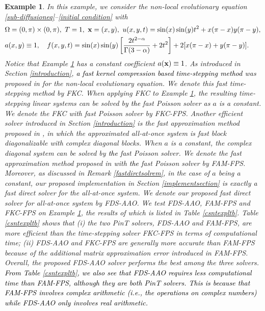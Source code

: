 \documentclass[11pt]{article}%
\numberwithin{equation}{section}
\newtheorem{example}{Example}
\begin{document}
\begin{example}\label{constexmpl}
	{\rm 	
		In this example, we consider the non-local evolutionary equation \eqref{sub-diffusioneq}--\eqref{initial condition} with
		\begin{align*}
		&\Omega=(0,\pi)\times(0,\pi),~ T=1,~{\bf x}=(x,y),~ u(x,y,t)=\sin(x)\sin(y)t^2+x(\pi-x)y(\pi-y),\\
		& a(x,y)\equiv 1,\quad f(x,y,t)=\sin(x)\sin(y)\left[\frac{2t^{2-\alpha}}{\Gamma(3-\alpha)}+2t^2\right]+2[x(\pi-x)+y(\pi-y)].
		\end{align*}
		Notice that Example \ref{constexmpl} has a constant coefficient $a({\bf x})\equiv 1$. As introduced in Section \ref{introduction}, \textcolor{black}{a fast kernel compression based  time-stepping method}  was proposed in \cite{jiang2017fast} for the non-local evolutionary equation. We denote  this fast time-stepping method by FKC. When applying FKC to Example \ref{constexmpl}, the resulting time-stepping linear systems can be solved by \textcolor{black}{the} fast Poisson solver as $a$ is a constant. We denote the FKC with fast Poisson solver by FKC-FPS.
	    Another efficient solver introduced in Section \ref{introduction} is the fast approximation method proposed in \cite{lin2016fast}, in which the approximated all-at-once system is fast block diagonalizable with complex diagonal blocks.  When $a$ is a constant, the complex diagonal system can be solved by \textcolor{black}{the} fast Poisson solver. We denote the fast approximation method proposed in \cite{lin2016fast} with \textcolor{black}{the} fast Poisson solver by FAM-FPS. Moreover, as discussed in Remark \ref{fastdirctsolrem}, in the case of $a$ being a constant, our proposed implementation in Section \ref{implementsection} is exactly a fast direct solver for the all-at-once system. We denote our proposed fast direct solver for all-at-once system by FDS-AAO. We test FDS-AAO, FAM-FPS and FKC-FPS on Example \ref{constexmpl}, the results of which is listed in Table \ref{csntexpltb}. Table \ref{csntexpltb} shows that (i) the two PinT solvers, FDS-AAO and FAM-FPS, are  more efficient than the time-stepping solver FKC-FPS in terms of computational time; (ii) FDS-AAO and FKC-FPS are generally more accurate than FAM-FPS because of the additional matrix approximation error introduced in FAM-FPS. Overall, the proposed FDS-AAO solver performs the best among the three solvers. \textcolor{black}{From Table \ref{csntexpltb}, we also see that FDS-AAO requires less computational time than FAM-FPS, although they are both PinT solvers. This is because that  FAM-FPS involves complex arithmetic (i.e., the operations on complex numbers) while FDS-AAO  only involves real arithmetic.}
}
\end{example}
\end{document}
